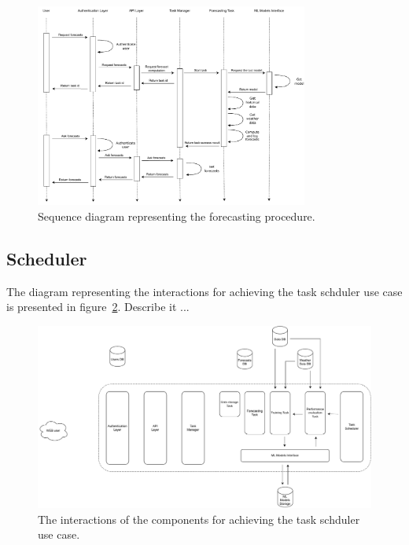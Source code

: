 \begin{figure}[H]
\centering 
\includegraphics[width=0.8\textwidth]{images/architecture_forecasting_sequence}
\caption{Sequence diagram representing the forecasting procedure.}
\label{fig:forecastingsequence}
\end{figure}


\vspace{0.1 cm}
\subsection{Scheduler}
\label{sec:scheduler}
\vspace{0.1 cm}

The diagram representing the interactions for achieving the task schduler use case is presented in figure~\ref{fig:schedulerinteractions}.
Describe it ...

\begin{figure}[H]
\centering 
\includegraphics[width=1\textwidth]{images/architecture_scheduler_interactions}
\caption{The interactions of the components for achieving the task schduler use case.}
\label{fig:schedulerinteractions}
\end{figure}

